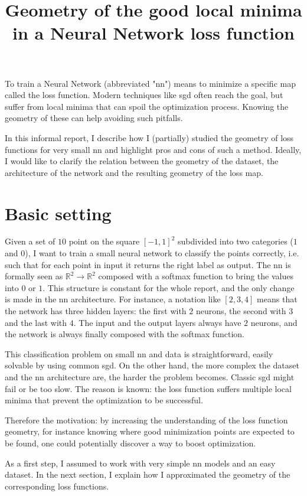 \documentclass{article}
\title {Geometry of the good local minima in a Neural Network loss function}
\begin{document}
\maketitle

To train a Neural Network (abbreviated "nn") means to minimize a specific
map called the loss function. Modern techniques like sgd often reach
the goal, but suffer from local minima that can spoil the
optimization process. Knowing the geometry of these can help
avoiding such pitfalls. 


In this informal report, I describe
how I (partially) studied the geometry of loss functions for very small nn
and highlight pros and cons of such a method. Ideally, I would like
to clarify the relation between the geometry of the dataset, the 
architecture of the network and the resulting geometry of the loss map.


\section{Basic setting}
Given a set of $10$ point on the square $[-1, 1]^2$ subdivided into two
categories ($1$ and $0$), 
I want to train a small neural network to classify the points 
correctly, i.e. such that for each point in input it returns the right
label as output.
The nn is formally seen as 
$\mathbb{R}^2 \to \mathbb{R}^2$ composed with a softmax function 
to bring the values into $0$ or $1$. This structure is constant for
the whole report, and the only change is made in the nn architecture.
For instance, a notation like $[2, 3, 4]$ 
means that the network has three hidden layers:
the first with $2$ neurons, the second with $3$ and the last with $4$. 
The input and the output layers always
have $2$ neurons, and the network is always finally composed with the 
softmax function.


This classification 
problem on small nn and data is straightforward, 
easily solvable by using common sgd.
On the other hand, the more complex the dataset and the nn architecture are,
the harder the problem becomes. 
Classic sgd might fail or
be too slow. The reason is known: the loss function suffers multiple 
local minima that prevent the optimization to be successful.


Therefore the motivation: by increasing the understanding of the
loss function geometry, for instance knowing where good minimization
points are expected to be found, one could potentially discover a way to
boost optimization.


As a first step, I assumed to work with very simple nn models
and an easy dataset.
In the next section, I explain how I approximated the geometry
of the corresponding loss functions.
\end{document}
